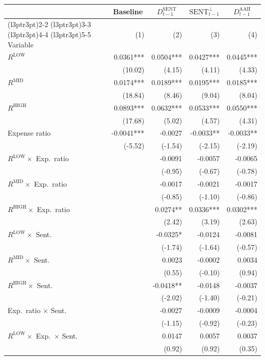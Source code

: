 \begin{table}[!htbp]
{\begin{tabular*}{\linewidth}{@{\extracolsep{\fill}}lrrrr}
\toprule
\multicolumn{1}{c}{ } & \multicolumn{1}{c}{Baseline} & \multicolumn{1}{c}{$D^{\text{SENT}}_{t-1}$} & \multicolumn{1}{c}{$\text{SENT}^\perp_{t-1}$} & \multicolumn{1}{c}{$D^{\text{AAII}}_{t-1}$} \\
\cmidrule(l{3pt}r{3pt}){2-2} \cmidrule(l{3pt}r{3pt}){3-3} \cmidrule(l{3pt}r{3pt}){4-4} \cmidrule(l{3pt}r{3pt}){5-5}
Variable & (1) & (2) & (3) & (4)\\
\midrule
$R^{\text{LOW}}$ & 0.0361*** & 0.0504*** & 0.0427*** & 0.0445***\\
 & (10.02) & (4.15) & (4.11) & (4.33)\\
$R^{\text{MID}}$ & 0.0174*** & 0.0189*** & 0.0195*** & 0.0185***\\
 & (18.84) & (8.46) & (9.04) & (8.04)\\
$R^{\text{HIGH}}$ & 0.0893*** & 0.0632*** & 0.0533*** & 0.0550***\\
 & (17.68) & (5.02) & (4.57) & (4.31)\\
Expense ratio & -0.0041*** & -0.0027 & -0.0033** & -0.0033**\\
 & (-5.52) & (-1.54) & (-2.15) & (-2.19)\\
$R^{\text{LOW}}\times$ Exp.\ ratio &  & -0.0091 & -0.0057 & -0.0065\\
 &  & (-0.95) & (-0.67) & (-0.78)\\
$R^{\text{MID}}\times$ Exp.\ ratio &  & -0.0017 & -0.0021 & -0.0017\\
 &  & (-0.85) & (-1.10) & (-0.86)\\
$R^{\text{HIGH}}\times$ Exp.\ ratio &  & 0.0274** & 0.0336*** & 0.0302***\\
 &  & (2.42) & (3.19) & (2.63)\\
$R^{\text{LOW}}\times$ Sent. &  & -0.0325* & -0.0124 & -0.0081\\
 &  & (-1.74) & (-1.64) & (-0.57)\\
$R^{\text{MID}}\times$ Sent. &  & 0.0023 & -0.0002 & 0.0034\\
 &  & (0.55) & (-0.10) & (0.94)\\
$R^{\text{HIGH}}\times$ Sent. &  & -0.0418** & -0.0148 & -0.0037\\
 &  & (-2.02) & (-1.40) & (-0.21)\\
Exp.\ ratio $\times$ Sent. &  & -0.0027 & -0.0009 & -0.0004\\
 &  & (-1.15) & (-0.92) & (-0.23)\\
$R^{\text{LOW}}\times$ Exp.\ $\times$ Sent. &  & 0.0147 & 0.0057 & 0.0037\\
 &  & (0.92) & (0.92) & (0.35)\\

\end{tabular*}}
\end{table}
